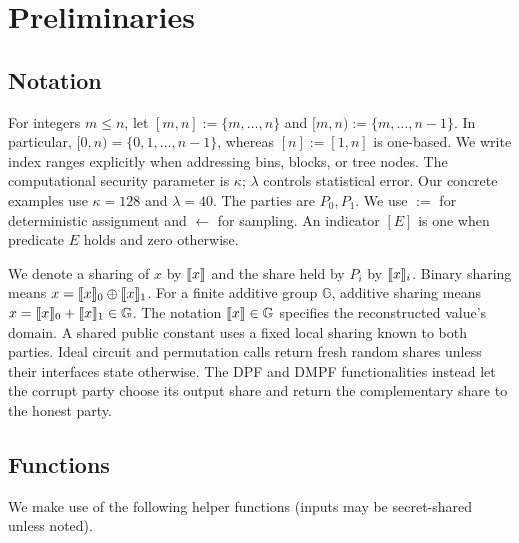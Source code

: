 \section{Preliminaries}



\subsection{Notation}

For integers $m\leq n$, let $[m,n]:=\{m,\ldots,n\}$ and
$[m,n):=\{m,\ldots,n-1\}$. In particular,
$[0,n)=\{0,1,\ldots,n-1\}$, whereas $[n]:=[1,n]$ is one-based.
We write index ranges explicitly when addressing bins, blocks, or tree nodes.
The computational security parameter is $\kappa$; $\lambda$ controls
statistical error. Our concrete examples use $\kappa=128$ and $\lambda=40$.
The parties are $P_0,P_1$.
We use $:=$ for deterministic assignment and $\gets$ for sampling.
An indicator $[E]$ is one when predicate $E$ holds and zero otherwise.



We denote a sharing of $x$ by $\share x$ and the share held by $P_i$
by $\share x_i$. Binary sharing means $x=\share x_0\oplus\share x_1$.
For a finite additive group $\mathbb G$, additive sharing means
$x=\share x_0+\share x_1\in\mathbb G$.
The notation $\share x\in\mathbb G$ specifies the reconstructed value's
domain. A shared public constant uses a fixed local sharing known to both
parties. Ideal circuit and permutation calls return fresh random shares
unless their interfaces state otherwise. The DPF and DMPF functionalities
instead let the corrupt party choose its output share and return the
complementary share to the honest party.

\subsection{Functions}
We make use of the following helper functions (inputs may be secret-shared unless noted).

